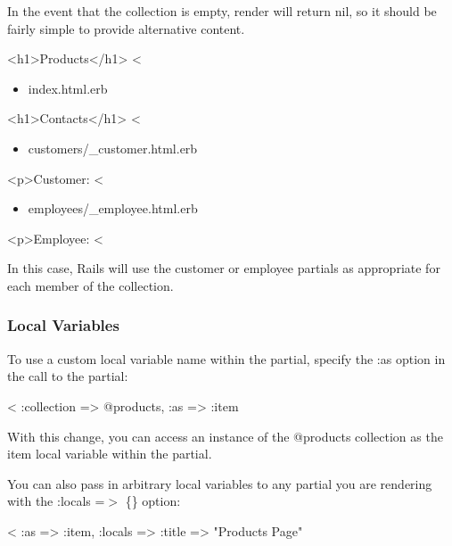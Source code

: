 \documentclass[10pt]{book}
\newenvironment{code}{%
  \scriptsize
    \verbatim
}{%
    \endverbatim
    \newline
}
\begin{document}
In the event that the collection is empty, render will return nil, so it should be fairly simple to provide alternative content.
\begin{code}
<h1>Products</h1>
<%
\end{code}
\begin{itemize}
	\item index.html.erb
\end{itemize}
\begin{code}
<h1>Contacts</h1>
<%
\end{code}
\begin{itemize}
	\item customers/\_customer.html.erb
\end{itemize}
\begin{code}
<p>Customer: <%
\end{code}
\begin{itemize}
	\item employees/\_employee.html.erb
\end{itemize}
\begin{code}
<p>Employee: <%
\end{code}

In this case, Rails will use the customer or employee partials as appropriate for each member of the collection.

\subsubsection{ Local Variables}

To use a custom local variable name within the partial, specify the :as option in the call to the partial:
\begin{code}
<%
  :collection => @products, :as => :item %
\end{code}

With this change, you can access an instance of the @products collection as the item local variable within the partial.

You can also pass in arbitrary local variables to any partial you are rendering with the :locals =$>$ \{\} option:
\begin{code}
<%
           :as => :item, :locals => {:title => "Products Page"} %
\end{code}
\end{document}
